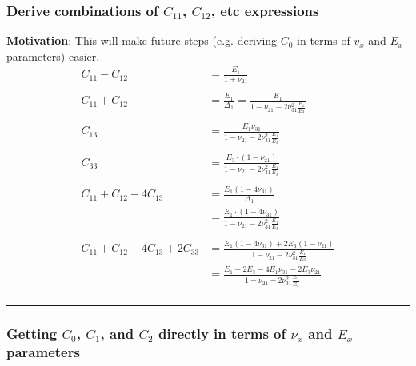 \documentclass{article}
\begin{document}
\subsubsection{Derive combinations of $C_{11}$, $C_{12}$, etc expressions}
\textbf{Motivation}: This will make future steps (e.g. deriving $C_0$ in terms of $v_x$ and $E_x$ parameters) easier.
\begin{align}
C_{11}-C_{12}
&=\frac{E_1}{1+\nu_{21}} \\
\\
C_{11}+C_{12}
&=\frac{E_1}{\Delta_1} =\frac{E_1}{ 1-\nu_{21}-2\nu_{31}^2\frac{E_1}{E_3} } \\
\\
C_{13} 
&= \frac{E_1 \nu_{31}}{ 1-\nu_{21}-2\nu_{31}^2\frac{E_1}{E_3} }  \\
\\
C_{33} 
&= \frac{ E_3 \cdot \left( 1-\nu_{21} \right) }{ 1-\nu_{21}-2\nu_{31}^2\frac{E_1}{E_3} }  \\
\\
C_{11}+C_{12}-4C_{13} 
&= \frac{E_1 \left(1-4\nu_{31} \right)}{\Delta_1}  \\
&= \frac{E_1 \cdot \left(1-4\nu_{31} \right)}{ 1-\nu_{21}-2\nu_{31}^2\frac{E_1}{E_3} }  \\
\\
C_{11}+C_{12}-4C_{13}+2C_{33} 
&= \frac{E_1 \left(1-4\nu_{31} \right) + 2 E_3 \left( 1-\nu_{21} \right) }{ 1-\nu_{21}-2\nu_{31}^2\frac{E_1}{E_3} }  \\
&= \frac{E_1+2E_3 -4 E_1 \nu_{31} - 2E_3 \nu_{21} }{ 1-\nu_{21}-2\nu_{31}^2\frac{E_1}{E_3} }  \\
\end{align}

\noindent\rule{8cm}{0.4pt}

\subsubsection{Getting $C_0$, $C_1$, and $C_2$ directly in terms of $\nu_x$ and $E_x$ parameters}
\end{document}
